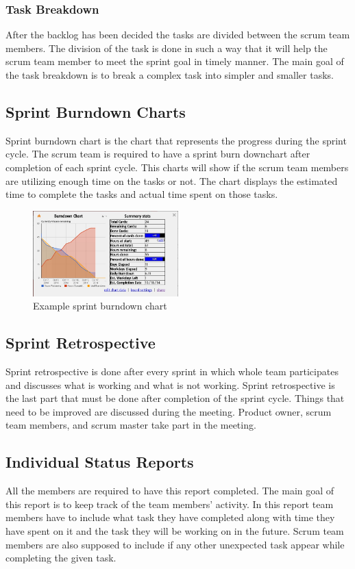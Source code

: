 \subsubsection{Task Breakdown}
After the backlog has been decided the tasks are divided between the scrum team members. The division of the task is done in such a way that it will help the scrum team member to meet the sprint goal in timely manner. The main goal of the task breakdown is to break a complex task into simpler and smaller tasks.

\subsection{Sprint Burndown Charts}
Sprint burndown chart is the chart that represents the progress during the sprint cycle. The scrum team is required to have a sprint burn downchart after completion of each sprint cycle. This charts will show if the scrum team members are utilizing enough time on the tasks or not. The chart displays the estimated time to complete the tasks and actual time spent on those tasks.

\begin{figure}[h!]
    \centering
    \includegraphics[width=0.5\textwidth]{images/test_image}
    \caption{Example sprint burndown chart}
\end{figure}

\subsection{Sprint Retrospective}
Sprint retrospective is done after every sprint in which whole team participates and discusses what is working and what is not working. Sprint retrospective is the last part that must be done after completion of the sprint cycle. Things that need to be improved are discussed during the meeting. Product owner, scrum team members, and scrum master take part in the  meeting. 

\subsection{Individual Status Reports}
All the members are required to have this report completed. The main goal of this report is to keep track of the team members' activity. In this report team members have to include what task they have completed along with time they have spent on it and the task they will be working on in the future. Scrum team members are also supposed to include if any other unexpected task appear while completing the given task.

